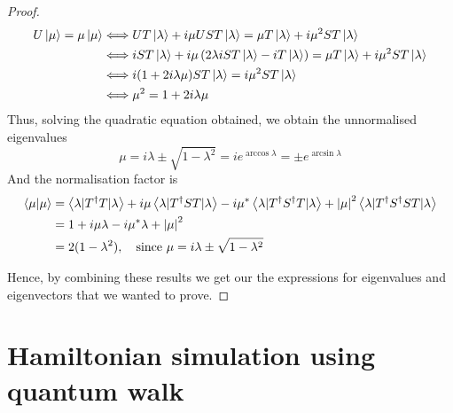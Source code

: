 \documentclass[
10pt, %
a4paper, %
oneside, %
headinclude,footinclude, %
BCOR5mm, %
]{scrartcl}
\begin{document}
\begin{proof}
\begin{align*}
U\ket\mu=\mu\ket\mu&\Longleftrightarrow UT\ket\lambda+i\mu UST\ket\lambda=\mu T\ket\lambda+i\mu^2ST\ket\lambda\\
&\Longleftrightarrow iST\ket\lambda+i\mu\left(2\lambda iST\ket\lambda-iT\ket\lambda\right)=\mu T\ket\lambda+i\mu^2ST\ket\lambda\\
&\Longleftrightarrow i(1+2i\lambda\mu)ST\ket\lambda=i\mu^2ST\ket\lambda\\
&\Longleftrightarrow \mu^2=1+2i\lambda\mu
\end{align*}
Thus, solving the quadratic equation obtained, we obtain the unnormalised eigenvalues
$$\mu=i\lambda\pm\sqrt{1-\lambda^2}=ie^{\arccos\lambda}=\pm e^{\arcsin\lambda}$$
And the normalisation factor is
\begin{align*}
\braket{\mu}{\mu}&=\left<\lambda|T^{\dagger}T|\lambda\right>+i\mu\left<\lambda|T^{\dagger}ST|\lambda\right>-i\mu^*\left<\lambda|T^{\dagger}S^{\dagger}T|\lambda\right>+\abs{\mu}^2\left<\lambda|T^{\dagger}S^{\dagger}ST|\lambda\right>\\
&=1+i\mu\lambda-i\mu^*\lambda+\abs{\mu}^2\\
&=2(1-\lambda^2),\ \ \ \text{since }\mu=i\lambda\pm\sqrt{1-\lambda^2}
\end{align*}

Hence, by combining these results we get our the expressions for eigenvalues and eigenvectors that we wanted to prove.
\end{proof}

\section{Hamiltonian simulation using quantum walk}
\end{document}
